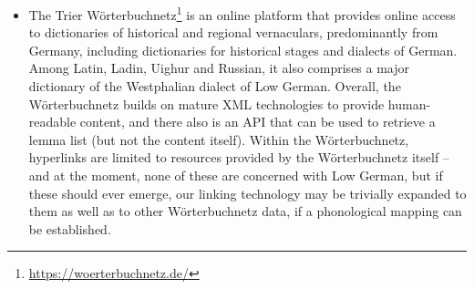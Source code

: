 \begin{itemize}
\item The Trier Wörterbuchnetz\footnote{\url{https://woerterbuchnetz.de/}} is an online platform that provides online access to dictionaries of historical and regional vernaculars, predominantly from Germany, including dictionaries for historical stages and dialects of German. Among Latin, Ladin, Uighur and Russian, it also comprises a major dictionary of the Westphalian dialect of Low German. %
Overall, the Wörterbuchnetz builds on mature XML technologies to provide human-readable content, and there also is an API that can be used to retrieve a lemma list (but not the content itself). Within the Wörterbuchnetz, hyperlinks are limited to resources provided by the Wörterbuchnetz itself -- and at the moment, none of these are concerned with Low German, %
but if these should ever emerge, our linking technology may be trivially expanded to them as well as to other Wörterbuchnetz data, if a phonological mapping can be established.


\end{itemize}
